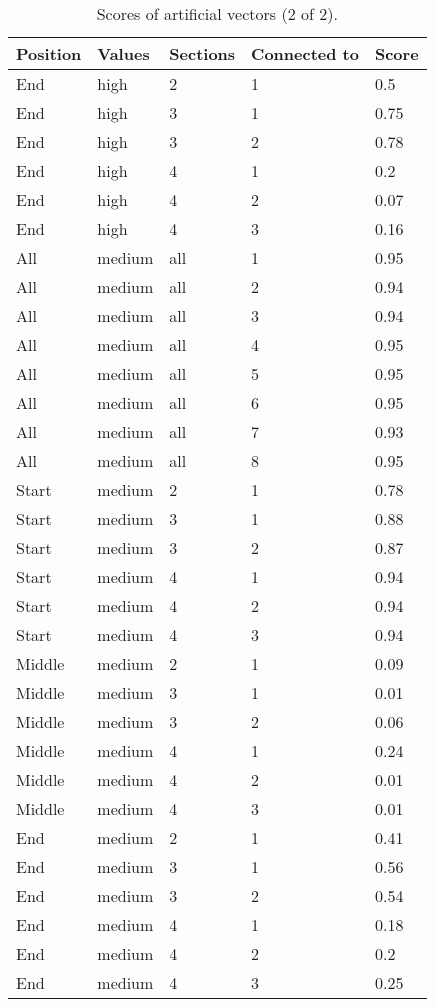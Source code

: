\begin{table}[!ht]
    \centering
    \captionsetup{justification=centering}
    \begin{tabular}{l|l|l|l|l}
    \hline
        \textbf{Position} & \textbf{Values} & \textbf{Sections} & \textbf{Connected to} & \textbf{Score}  \\ \hline
End & high & 2 & 1 & 0.5\\ \hline
End & high & 3 & 1 & 0.75\\ \hline
End & high & 3 & 2 & 0.78\\ \hline
End & high & 4 & 1 & 0.2\\ \hline
End & high & 4 & 2 & 0.07\\ \hline
End & high & 4 & 3 & 0.16\\ \hline
All & medium & all & 1 & 0.95\\ \hline
All & medium & all & 2 & 0.94\\ \hline
All & medium & all & 3 & 0.94\\ \hline
All & medium & all & 4 & 0.95\\ \hline
All & medium & all & 5 & 0.95\\ \hline
All & medium & all & 6 & 0.95\\ \hline
All & medium & all & 7 & 0.93\\ \hline
All & medium & all & 8 & 0.95\\ \hline
Start & medium & 2 & 1 & 0.78\\ \hline
Start & medium & 3 & 1 & 0.88\\ \hline
Start & medium & 3 & 2 & 0.87\\ \hline
Start & medium & 4 & 1 & 0.94\\ \hline
Start & medium & 4 & 2 & 0.94\\ \hline
Start & medium & 4 & 3 & 0.94\\ \hline
Middle & medium & 2 & 1 & 0.09\\ \hline
Middle & medium & 3 & 1 & 0.01\\ \hline
Middle & medium & 3 & 2 & 0.06\\ \hline
Middle & medium & 4 & 1 & 0.24\\ \hline
Middle & medium & 4 & 2 & 0.01\\ \hline
Middle & medium & 4 & 3 & 0.01\\ \hline
End & medium & 2 & 1 & 0.41\\ \hline
End & medium & 3 & 1 & 0.56\\ \hline
End & medium & 3 & 2 & 0.54\\ \hline
End & medium & 4 & 1 & 0.18\\ \hline
End & medium & 4 & 2 & 0.2\\ \hline
End & medium & 4 & 3 & 0.25\\ \hline
        
        
        \end{tabular}
    \caption{Scores of artificial vectors (2 of 2).}
    \label{tabInsightModel2}
\end{table}

